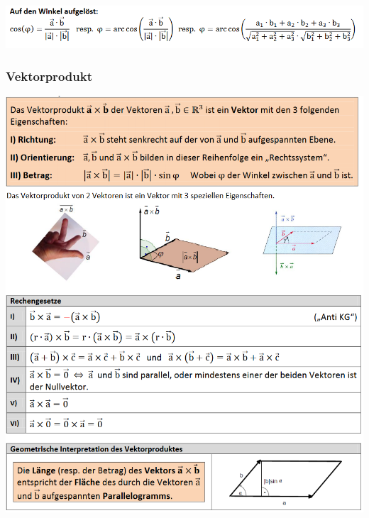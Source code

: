 \includegraphics[scale=0.7]{vec4-2.PNG}

\subsubsection{Vektorprodukt}
\includegraphics[scale=0.7]{vec5.PNG}
\newpage{}
